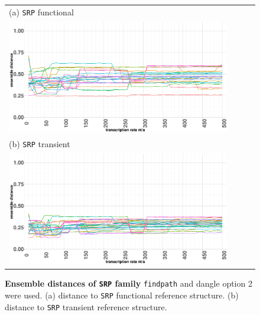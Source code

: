 \documentclass[ twoside,openright,titlepage,numbers=noenddot,headinclude,%
                footinclude=false, cleardoublepage=empty,abstractoff, %
                BCOR=5mm,paper=a4,fontsize=11pt,%
                ngerman,american,%
                ]{scrreprt}
\begin{document}
\begin{figure}
\begin{tabular}{l}
(a) \texttt{SRP} functional \\
\includegraphics[width=0.9\textwidth]{./pictures/ensembleDistance/ensembleDistance_SRPFunctional.pdf}\\ 
\hline
(b) \texttt{SRP} transient\\
\includegraphics[width=0.9\textwidth]{./pictures/ensembleDistance/ensembleDistance_SRPtransient.pdf}\\
\end{tabular}
\caption{{\bf Ensemble distances of \texttt{SRP} family}
\texttt{findpath} and dangle option 2 were used.
 (a) distance to \texttt{SRP} functional reference structure.
 (b) distance to \texttt{SRP} transient reference structure. 
 }
\label{fig:ensembleDistanceSRP}
\end{figure}			
 							
\end{document}
